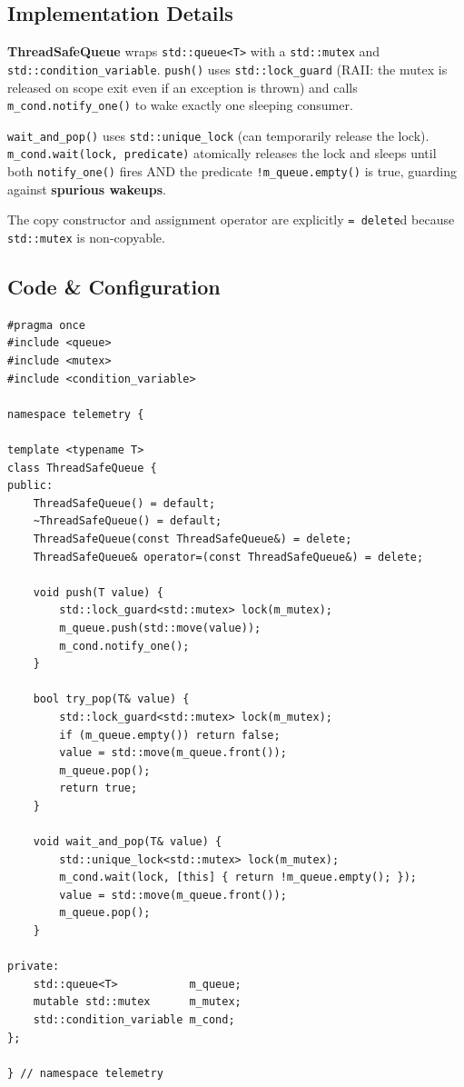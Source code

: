 \documentclass[11pt, a4paper]{article}
\begin{document}
\subsection{Implementation Details}
\textbf{ThreadSafeQueue} wraps \texttt{std::queue<T>} with a
\texttt{std::mutex} and \texttt{std::condition\_variable}.
\texttt{push()} uses \texttt{std::lock\_guard} (RAII: the mutex is
released on scope exit even if an exception is thrown) and calls
\texttt{m\_cond.notify\_one()} to wake exactly one sleeping consumer.

\texttt{wait\_and\_pop()} uses \texttt{std::unique\_lock} (can temporarily
release the lock). \texttt{m\_cond.wait(lock, predicate)} atomically
releases the lock and sleeps until both \texttt{notify\_one()} fires AND
the predicate \texttt{!m\_queue.empty()} is true, guarding against
\textbf{spurious wakeups}.

The copy constructor and assignment operator are explicitly
\texttt{= delete}d because \texttt{std::mutex} is non-copyable.

\subsection{Code \& Configuration}
\begin{lstlisting}[style=cppstyle, caption={backend/src/telemetry/ThreadSafeQueue.h}]
#pragma once
#include <queue>
#include <mutex>
#include <condition_variable>

namespace telemetry {

template <typename T>
class ThreadSafeQueue {
public:
    ThreadSafeQueue() = default;
    ~ThreadSafeQueue() = default;
    ThreadSafeQueue(const ThreadSafeQueue&) = delete;
    ThreadSafeQueue& operator=(const ThreadSafeQueue&) = delete;

    void push(T value) {
        std::lock_guard<std::mutex> lock(m_mutex);
        m_queue.push(std::move(value));
        m_cond.notify_one();
    }

    bool try_pop(T& value) {
        std::lock_guard<std::mutex> lock(m_mutex);
        if (m_queue.empty()) return false;
        value = std::move(m_queue.front());
        m_queue.pop();
        return true;
    }

    void wait_and_pop(T& value) {
        std::unique_lock<std::mutex> lock(m_mutex);
        m_cond.wait(lock, [this] { return !m_queue.empty(); });
        value = std::move(m_queue.front());
        m_queue.pop();
    }

private:
    std::queue<T>           m_queue;
    mutable std::mutex      m_mutex;
    std::condition_variable m_cond;
};

} // namespace telemetry
\end{lstlisting}
\end{document}
